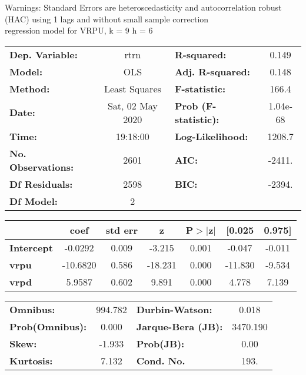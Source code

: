 Warnings: \newline
 [1] Standard Errors are heteroscedasticity and autocorrelation robust (HAC) using 1 lags and without small sample correction\\ 

regression model for VRPU, k = 9 h = 6\begin{center}
\begin{tabular}{lclc}
\toprule
\textbf{Dep. Variable:}    &       rtrn       & \textbf{  R-squared:         } &     0.149   \\
\textbf{Model:}            &       OLS        & \textbf{  Adj. R-squared:    } &     0.148   \\
\textbf{Method:}           &  Least Squares   & \textbf{  F-statistic:       } &     166.4   \\
\textbf{Date:}             & Sat, 02 May 2020 & \textbf{  Prob (F-statistic):} &  1.04e-68   \\
\textbf{Time:}             &     19:18:00     & \textbf{  Log-Likelihood:    } &    1208.7   \\
\textbf{No. Observations:} &        2601      & \textbf{  AIC:               } &    -2411.   \\
\textbf{Df Residuals:}     &        2598      & \textbf{  BIC:               } &    -2394.   \\
\textbf{Df Model:}         &           2      & \textbf{                     } &             \\
\bottomrule
\end{tabular}
\begin{tabular}{lcccccc}
                   & \textbf{coef} & \textbf{std err} & \textbf{z} & \textbf{P$> |$z$|$} & \textbf{[0.025} & \textbf{0.975]}  \\
\midrule
\textbf{Intercept} &      -0.0292  &        0.009     &    -3.215  &         0.001        &       -0.047    &       -0.011     \\
\textbf{vrpu}      &     -10.6820  &        0.586     &   -18.231  &         0.000        &      -11.830    &       -9.534     \\
\textbf{vrpd}      &       5.9587  &        0.602     &     9.891  &         0.000        &        4.778    &        7.139     \\
\bottomrule
\end{tabular}
\begin{tabular}{lclc}
\textbf{Omnibus:}       & 994.782 & \textbf{  Durbin-Watson:     } &    0.018  \\
\textbf{Prob(Omnibus):} &   0.000 & \textbf{  Jarque-Bera (JB):  } & 3470.190  \\
\textbf{Skew:}          &  -1.933 & \textbf{  Prob(JB):          } &     0.00  \\
\textbf{Kurtosis:}      &   7.132 & \textbf{  Cond. No.          } &     193.  \\
\bottomrule
\end{tabular}
\end{center}

